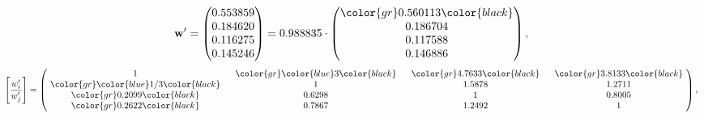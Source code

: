 \begin{example}
\begin{equation*}
\mathbf{w}^{\prime} =
\begin{pmatrix}
0.553859\\
0.184620\\
0.116275\\
0.145246
\end{pmatrix} =
0.988835\cdot
\begin{pmatrix}
\color{gr} 0.560113\color{black} \\
0.186704\\
0.117588\\
0.146886
\end{pmatrix},
\end{equation*}
\begin{equation*}
\left[ \frac{{w}^{\prime}_i}{{w}^{\prime}_j} \right] =
\begin{pmatrix}
$\,\,$ 1 $\,\,$ & $\,\,$\color{gr} \color{blue} 3\color{black} $\,\,$ & $\,\,$\color{gr} 4.7633\color{black} $\,\,$ & $\,\,$\color{gr} 3.8133\color{black} $\,\,$ \\
$\,\,$\color{gr} \color{blue}  1/3\color{black} $\,\,$ & $\,\,$ 1 $\,\,$ & $\,\,$1.5878$\,\,$ & $\,\,$1.2711  $\,\,$ \\
$\,\,$\color{gr} 0.2099\color{black} $\,\,$ & $\,\,$0.6298$\,\,$ & $\,\,$ 1 $\,\,$ & $\,\,$0.8005 $\,\,$ \\
$\,\,$\color{gr} 0.2622\color{black} $\,\,$ & $\,\,$0.7867$\,\,$ & $\,\,$1.2492$\,\,$ & $\,\,$ 1  $\,\,$ \\
\end{pmatrix},
\end{equation*}
\end{example}
\newpage
